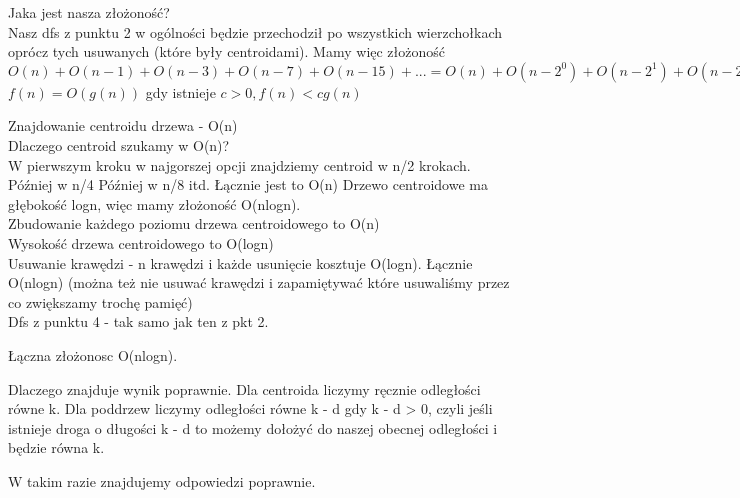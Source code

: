 \documentclass[12pt]{article}
\begin{document}
Jaka jest nasza złożoność?\\
Nasz dfs z punktu 2 w ogólności będzie przechodził po wszystkich wierzchołkach oprócz tych usuwanych (które były centroidami). 
Mamy więc złożoność $O(n) + O(n-1) + O(n-3) + O(n-7) + O(n-15) + ... = O(n) + O(n - 2^0) + O(n - 2^1) + O(n - 2^2) + O(n - 2^3) + O(n - 2^k) = O(nlogn)$
$f(n) = O(g(n))$ gdy istnieje $c > 0, f(n) < cg(n)$

Znajdowanie centroidu drzewa - O(n)\\
Dlaczego centroid szukamy w O(n)?\\
W pierwszym kroku w najgorszej opcji znajdziemy centroid w n/2 krokach.
Później w n/4
Później w n/8
itd.
Łącznie jest to O(n) 
Drzewo centroidowe ma głębokość logn, więc mamy złożoność O(nlogn).\\
Zbudowanie każdego poziomu drzewa centroidowego to O(n)\\
Wysokość drzewa centroidowego to O(logn)\\
Usuwanie krawędzi - n krawędzi i każde usunięcie kosztuje O(logn). Łącznie O(nlogn)
(można też nie usuwać krawędzi i zapamiętywać które usuwaliśmy przez co zwiększamy trochę pamięć)\\

Dfs z punktu 4 - tak samo jak ten z pkt 2.

Łączna złożonosc O(nlogn).




Dlaczego znajduje wynik poprawnie.
Dla centroida liczymy ręcznie odległości równe k.
Dla poddrzew liczymy odległości równe k - d gdy k - d > 0, czyli jeśli istnieje droga o długości k - d to możemy dołożyć do naszej obecnej odległości i będzie równa k.

W takim razie znajdujemy odpowiedzi poprawnie.
\end{document}
